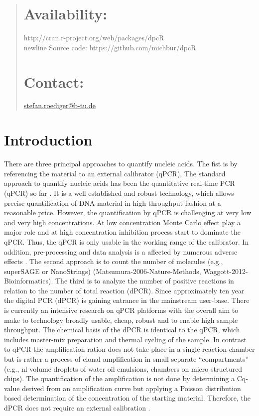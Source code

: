 \documentclass{bioinfo}
\begin{document}
\begin{abstract}
\section{Availability:}
http://cran.r-project.org/web/packages/dpcR\\newline
Source code: https://github.com/michbur/dpcR\

\section{Contact:} \href{stefan.roediger@b-tu.de}{stefan.roediger@b-tu.de}
\end{abstract}

\section{Introduction}
There are three principal approaches to quantify nucleic acids. The fist is by 
referencing the material to an external calibrator (qPCR), The standard approach 
to quantify nucleic acids has been the quantitative real-time PCR (qPCR) so far \cite{pabinger_survey_2014}. 
It is a well established and robust technology, which allows precise 
quantification of DNA material in high throughput fashion at a reasonable price. 
However, the quantification by qPCR is challenging at very low and very high 
concentrations. At low concentration Monte Carlo effect play a major role and at 
high concentration inhibition process start to dominate the qPCR. Thus, the qPCR 
is only usable in the working range of the calibrator. In addition, pre-processing and data analysis is a affected by numerous adverse effects \cite{spiess_impact_2015}. The second 
approach is to count the number of molecules (e.g., superSAGE or NanoStrings) 
(Matsumura-2006-Nature-Methods, Waggott-2012-Bioinformatics). The third is to 
analyze the number of positive reactions in relation to the number of total 
reaction (dPCR). Since approximately ten year the digital PCR (dPCR) is gaining 
entrance in the mainstream user-base. There is currently an intensive research 
on qPCR platforms with the overall aim to make to technology broadly usable, 
cheap, robust and to enable high sample throughput. The chemical basis of the 
dPCR is identical to the qPCR, which includes master-mix preparation and thermal 
cycling of the sample. In contrast to qPCR the amplification ration does not 
take place in a single reaction chamber but is rather a process of clonal 
amplification in small separate ``compartments'' (e.g., nl volume droplets of 
water oil emulsions, chambers on micro structured chips). The quantification of 
the amplification is not done by determining a Cq-value derived from an 
amplification curve but applying a Poisson distribution based determination of 
the concentration of the starting material. Therefore, the dPCR does not require 
an external calibration \cite{selck_increased_2013, rodiger_r_2015}.
\end{document}
